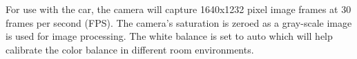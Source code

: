 \documentclass{article}
\begin{document}
For use with the car, the camera will capture 1640x1232 pixel image frames at 30 frames per second (FPS). The camera's saturation is zeroed as a gray-scale image is used for image processing. The white balance is set to auto which will help calibrate the color balance in different room environments.

\end{document}
